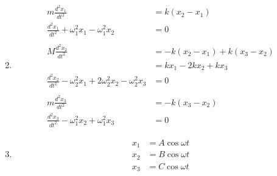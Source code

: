 \documentclass{article}
\begin{document}
\begin{enumerate}
  \setcounter{enumi}{1}
  \item

        \begin{align*}
          m \frac{d^2 x_1}{d t^2}                                                    & = k (x_2 - x_1)                  \\
          \frac{d^2 x_1}{d t^2} + \omega_1^2 x_1 - \omega_1^2 x_2                    & = 0                              \\ \\
          M \frac{d^2 x_2}{d t^2}                                                    & = -k (x_2 - x_1) + k (x_3 - x_2) \\
                                                                                     & = k x_1 - 2 k x_2 + k x_3        \\
          \frac{d^2 x_2}{d t^2} - \omega_2^2 x_1 + 2 \omega_2^2 x_2 - \omega_2^2 x_3 & = 0                              \\ \\
          m \frac{d^2 x_3}{d t^2}                                                    & = -k (x_3 - x_2)                 \\
          \frac{d^2 x_3}{d t^2} - \omega_1^2 x_2 + \omega_1^2 x_3                    & = 0
        \end{align*}

  \item

        \begin{align*}
          x_1 & = A \cos \omega t \\
          x_2 & = B \cos \omega t \\
          x_3 & = C \cos \omega t
        \end{align*}


\end{enumerate}
\end{document}
